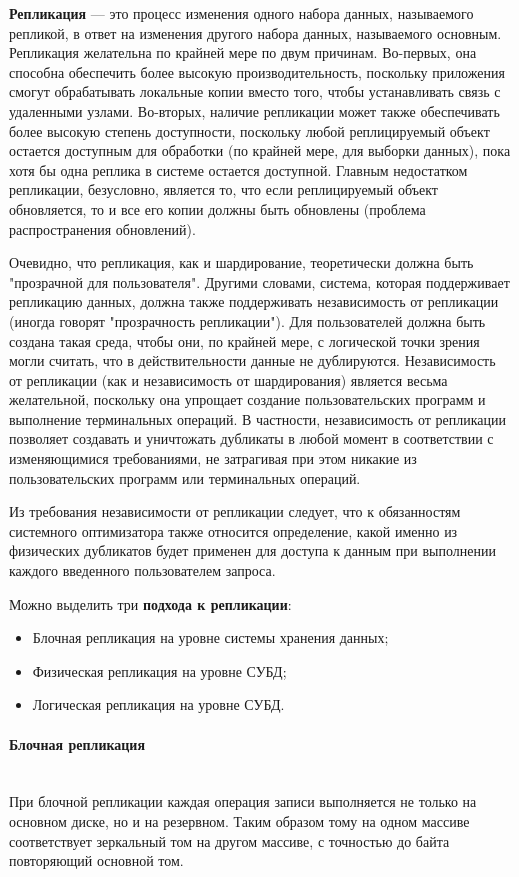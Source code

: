 \textbf{Репликация} — это процесс изменения одного набора данных, называемого репликой, в ответ на изменения другого
набора данных, называемого основным. Репликация желательна по крайней мере по двум причинам. Во-первых, она способна
обеспечить более высокую производительность, поскольку приложения смогут обрабатывать локальные копии вместо того,
чтобы устанавливать связь с удаленными узлами. Во-вторых, наличие репликации может также обеспечивать более высокую
степень доступности, поскольку любой реплицируемый объект остается доступным для обработки (по крайней мере, для выборки
данных), пока хотя бы одна реплика в системе остается доступной. Главным недостатком репликации, безусловно, является
то, что если реплицируемый объект обновляется, то и все его копии должны быть обновлены (проблема распространения
обновлений).

Очевидно, что репликация, как и шардирование, теоретически должна быть "прозрачной для пользователя". Другими словами,
система, которая поддерживает репликацию данных, должна также поддерживать независимость от репликации (иногда говорят
"прозрачность репликации"). Для пользователей должна быть создана такая среда, чтобы они, по крайней мере, с логической
точки зрения могли считать, что в действительности данные не дублируются. Независимость от репликации (как и
независимость от шардирования) является весьма желательной, поскольку она упрощает создание пользовательских программ и
выполнение терминальных операций. В частности, независимость от репликации позволяет создавать и уничтожать дубликаты в
любой момент в соответствии с изменяющимися требованиями, не затрагивая при этом никакие из пользовательских программ
или терминальных операций.

Из требования независимости от репликации следует, что к обязанностям системного оптимизатора также относится
определение, какой именно из физических дубликатов будет применен для доступа к данным при выполнении каждого
введенного пользователем запроса. \autocite{IntroBD2014}

Можно выделить три \textbf{подхода к репликации}:
\begin{itemize}
    \item Блочная репликация на уровне системы хранения данных;
    \item Физическая репликация на уровне СУБД;
    \item Логическая репликация на уровне СУБД.
\end{itemize}

\paragraph{Блочная репликация} ~\\
При блочной репликации каждая операция записи выполняется не только на основном диске, но и на резервном. Таким образом
тому на одном массиве соответствует зеркальный том на другом массиве, с точностью до байта повторяющий основной том.

